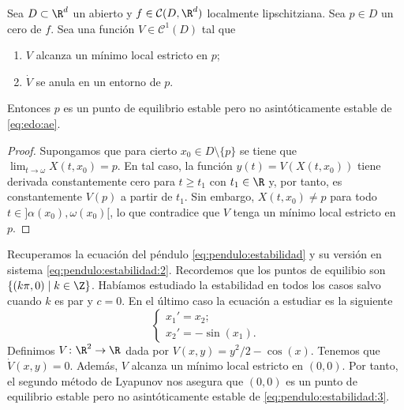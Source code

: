 \begin{corollary}
  Sea $D \subset \R^d$ un abierto y $f \in \mathcal{C}(D, \R^d)$ localmente lipschitziana. Sea
  $p \in D$ un cero de $f$. Sea una función $V \in \mathcal{C}^1(D)$ tal que
  \begin{enumerate}
  \item $V$ alcanza un mínimo local estricto en $p$;
  \item $\dot{V}$ se anula en un entorno de $p$.
  \end{enumerate}
  Entonces $p$ es un punto de equilibrio estable pero no asintóticamente estable de
  \eqref{eq:edo:ae}.
\end{corollary}
\begin{proof}
  Supongamos que para cierto $x_0 \in D \setminus \{p\}$ se tiene que
  $\lim_{t \to \omega} X(t,x_0) = p$. En tal caso, la función $y(t) = V(X(t,x_0))$ tiene derivada
  constantemente cero para $t \ge t_1$ con $t_1 \in \R$ y, por tanto, es constantemente $V(p)$ a
  partir de $t_1$. Sin embargo, $X(t,x_0) \ne p$ para todo $t\in ]\alpha(x_0),\omega(x_0)[$, lo que
  contradice que $V$ tenga un mínimo local estricto en $p$.
\end{proof}

\begin{ex}
  Recuperamos la ecuación del péndulo \eqref{eq:pendulo:estabilidad} y su versión en sistema
  \eqref{eq:pendulo:estabilidad:2}. Recordemos que los puntos de equilibio son
  $\{(k \pi, 0) \mid k \in \Z\}$. Habíamos estudiado la estabilidad en todos los casos salvo cuando
  $k$ es par y $c = 0$. En el último caso la ecuación a estudiar es la siguiente
  \begin{equation}
    \label{eq:pendulo:estabilidad:3}
    \begin{cases}
      x_1' = x_2; \\
      x_2' = - \sin(x_1).
    \end{cases}
  \end{equation}
  Definimos $V \colon \R^2 \to \R$ dada por $V(x,y) = y^2 /2 - \cos(x)$. Tenemos que
  $\dot{V}(x,y) = 0$. Además, $V$ alcanza un mínimo local estricto en $(0,0)$. Por tanto, el segundo
  método de Lyapunov nos asegura que $(0,0)$ es un punto de equilibrio estable pero no
  asintóticamente estable de \eqref{eq:pendulo:estabilidad:3}.
\end{ex}

